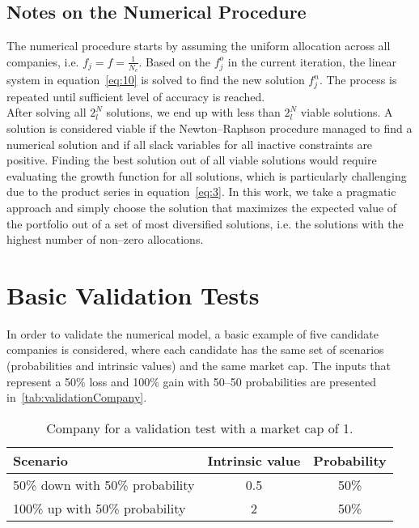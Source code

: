 \documentclass{article}
\begin{document}
\subsection{Notes on the Numerical Procedure}
\label{sec:numericalNotes}

\noindent The numerical procedure starts by assuming the uniform allocation
across all companies, i.e. $f_j = f = \frac{1}{N_c}$. Based on the $f_j^o$ in
the current iteration, the linear system in equation~\eqref{eq:10} is solved to
find the new solution $f_j^n$. The process is repeated until sufficient level of
accuracy is reached.\\

\indent After solving all $2^N_l$ solutions, we end up with less than $2^N_l$
viable solutions. A solution is considered viable if the Newton--Raphson
procedure managed to find a numerical solution and if all slack variables
for all inactive constraints are positive. Finding the best solution out of all
viable solutions would require evaluating the growth function for all
solutions, which is particularly challenging due to the product series
in equation~\eqref{eq:3}. In this work, we take a pragmatic approach and
simply choose the solution that maximizes the expected value of the portfolio
out of a set of most diversified solutions, i.e. the solutions with the highest
number of non--zero allocations.

\section{Basic Validation Tests}
\label{sec:validation}

\noindent In order to validate the numerical model, a basic example of five
candidate companies is considered, where each candidate has the same set of
scenarios (probabilities and intrinsic values) and the same market cap.
The inputs that represent a 50\% loss and 100\% gain with 50--50 probabilities
are presented in~\autoref{tab:validationCompany}.\\

\begin{table}[!ht]
\caption{Company for a validation test with a market cap of 1.}
\vspace{0.25cm}
\centering
\begin{tabular}{l|c|c}
Scenario & Intrinsic value & Probability \\
\hline
50\% down with 50\% probability & 0.5 & 50\% \\
100\% up with 50\% probability & 2 & 50\% \\
\end{tabular}%
\label{tab:validationCompany}%
\end{table}%
\end{document}
